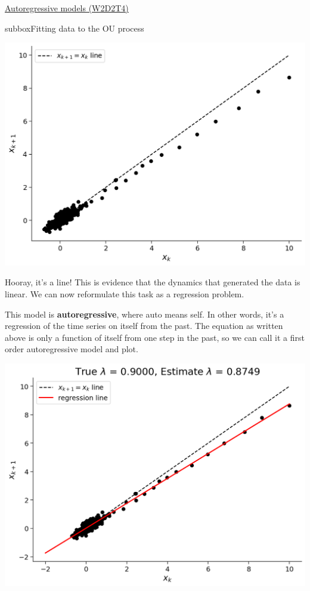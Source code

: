 \begin{textbox}{\href{https://compneuro.neuromatch.io/tutorials/W2D2_LinearSystems/student/W2D2_Tutorial4.html}{Autoregressive models (W2D2T4)} }
\begin{subbox}{subbox}{Fitting data to the OU process}
\begin{center}
\includegraphics[scale=0.14]{Figures/LS/CDS_Figure9.png}
\end{center}


Hooray, it's a line! This is evidence that the dynamics that generated the data is linear. We can now reformulate this task as a regression problem.

This model is \textbf{autoregressive}, where auto means self. In other words, it's a regression of the time series on itself from the past. The equation as written above is only a function of itself from one step in the past, so we can call it a first order autoregressive model and plot.
\begin{center}
\includegraphics[scale=0.14]{Figures/LS/CDS_Figure10.png}
\end{center}

\end{subbox}

\end{textbox}
